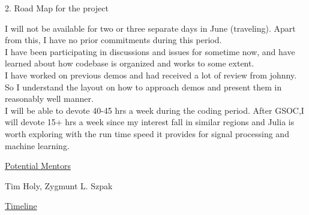 
\Huge
\textsf{2. Road Map for the project}

\vspace{0.5cm}
\large
I will not be available for two or three separate days in June (traveling). Apart from this, I have no prior commitments during this period.\\
I have been participating in discussions and issues for sometime now, and have learned about how codebase is organized and works to some extent.\\
I have worked on previous demos and had received a lot of review from johnny. So I understand the layout on how to approach demos and present them in reasonably well manner.\\
I will be able to devote 40-45 hrs a week during the coding period. After GSOC,I will devote 15+ hrs a week since my interest fall in similar regions and Julia is worth exploring with the run time speed it provides for signal processing and machine learning.

\vspace{0.2cm}
\Large
\underline{\textsf{Potential Mentors}}

\vspace{0.3cm}
\large
Tim Holy, Zygmunt L. Szpak

\vspace{0.2cm}
\Large
\underline{\textsf{Timeline}}

